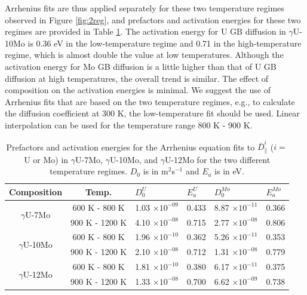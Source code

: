 \documentclass{elsarticle}
\begin{document}
Arrhenius fits are thus applied separately for these two temperature regimes observed in Figure \ref{fig:2reg}, and prefactors and activation energies for these two regimes are provided in Table \ref{tab:2reg}. The activation energy for U GB diffusion in $\gamma$U-10Mo is 0.36 eV in the low-temperature regime and 0.71 in the high-temperature regime, which is almost double the value at low temperatures. Although the activation energy for Mo GB diffusion is a little higher than that of U GB diffusion at high temperatures, the overall trend is similar. The effect of composition on the activation energies is minimal. We suggest the use of Arrhenius fits that are based on the two temperature regimes, e.g., to calculate the diffusion coefficient at 300 K, the low-temperature fit should be used. Linear interpolation can be used for the temperature range 800 K - 900 K.

\begin{table}[!ht]
\centering
\caption{Prefactors and activation energies for the Arrhenius equation fits to $\overline{D}^{i}_{\parallel}$ ($i=$ U or Mo) in $\gamma$U-7Mo, $\gamma$U-10Mo, and $\gamma$U-12Mo for the two different temperature regimes. $D_0$ is in m$^2$s$^{-1}$ and $E_a$ is in eV.}
\label{tab:2reg}
\begin{tabular}{ccllll}
\toprule
Composition & Temp.
	& $D_{0}^U$      & $E_{a}^U$
	& $D_{0}^{Mo}$   & $E_{a}^{Mo}$ \\
\midrule
\multirow{2}{*}{ $\gamma$U-7Mo }
	& 600 K - 800 K
	& 1.03 $\times 10^{-09}$ & 0.433
	& 8.87 $\times 10^{-11}$ & 0.366 \\
	& 900 K - 1200 K
	& 4.10 $\times 10^{-08}$ & 0.715
	& 2.77 $\times 10^{-08}$ & 0.806 \vspace{0.2cm } \\
\multirow{2}{*}{ $\gamma$U-10Mo }
	& 600 K - 800 K
	& 1.96 $\times 10^{-10}$ & 0.362
	& 5.26 $\times 10^{-11}$ & 0.353 \\
	& 900 K - 1200 K
	& 2.10 $\times 10^{-08}$ & 0.712
	& 1.31 $\times 10^{-08}$ & 0.779 \vspace{0.2cm } \\
\multirow{2}{*}{ $\gamma$U-12Mo }
	& 600 K - 800 K
	& 1.81 $\times 10^{-10}$ & 0.380
	& 6.17 $\times 10^{-11}$ & 0.375 \\
	& 900 K - 1200 K
	& 1.33 $\times 10^{-08}$ & 0.700
	& 6.62 $\times 10^{-09}$ & 0.738 \\
\bottomrule
\end{tabular}
\end{table}
\end{document}
